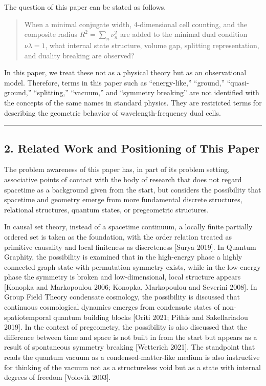 \documentclass[
]{article}
\begin{document}
The question of this paper can be stated as follows.

\begin{quote}
When a minimal conjugate width, 4-dimensional cell counting, and the
composite radius \(R^2=\sum_n\nu_n^2\) are added to the minimal dual
condition \(\nu\lambda=1\), what internal state structure, volume gap,
splitting representation, and duality breaking are observed?
\end{quote}

In this paper, we treat these not as a physical theory but as an
observational model. Therefore, terms in this paper such as
``energy-like,'' ``ground,'' ``quasi-ground,'' ``splitting,''
``vacuum,'' and ``symmetry breaking'' are not identified with the
concepts of the same names in standard physics. They are restricted
terms for describing the geometric behavior of wavelength-frequency dual
cells.

\begin{center}\rule{0.5\linewidth}{0.5pt}\end{center}

\subsection{2. Related Work and Positioning of This
Paper}\label{related-work-and-positioning-of-this-paper}

The problem awareness of this paper has, in part of its problem setting,
associative points of contact with the body of research that does not
regard spacetime as a background given from the start, but considers the
possibility that spacetime and geometry emerge from more fundamental
discrete structures, relational structures, quantum states, or
pregeometric structures.

In causal set theory, instead of a spacetime continuum, a locally finite
partially ordered set is taken as the foundation, with the order
relation treated as primitive causality and local finiteness as
discreteness {[}Surya 2019{]}. In Quantum Graphity, the possibility is
examined that in the high-energy phase a highly connected graph state
with permutation symmetry exists, while in the low-energy phase the
symmetry is broken and low-dimensional, local structure appears
{[}Konopka and Markopoulou 2006; Konopka, Markopoulou and Severini
2008{]}. In Group Field Theory condensate cosmology, the possibility is
discussed that continuous cosmological dynamics emerges from condensate
states of non-spatiotemporal quantum building blocks {[}Oriti 2021;
Pithis and Sakellariadou 2019{]}. In the context of pregeometry, the
possibility is also discussed that the difference between time and space
is not built in from the start but appears as a result of spontaneous
symmetry breaking {[}Wetterich 2021{]}. The standpoint that reads the
quantum vacuum as a condensed-matter-like medium is also instructive for
thinking of the vacuum not as a structureless void but as a state with
internal degrees of freedom {[}Volovik 2003{]}.
\end{document}

